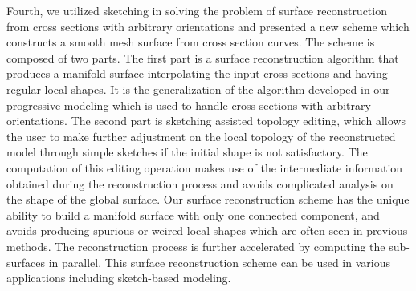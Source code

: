 Fourth, we utilized sketching  in solving the problem of surface
reconstruction from cross sections with arbitrary orientations and
presented a new scheme which constructs a smooth mesh surface from
cross section curves. The scheme is composed of two parts. The first
part is a surface reconstruction algorithm that produces a manifold
surface interpolating the input cross sections and having regular
local shapes. It is the  generalization of the algorithm developed
in our progressive modeling which is used to handle cross sections with arbitrary
orientations. The second part is sketching assisted topology
editing, which allows the user to make further adjustment on the
local topology of the reconstructed model through simple sketches if
the initial shape is not satisfactory. The computation of this
editing operation makes use of the intermediate information obtained
during the reconstruction process and avoids complicated analysis on
the shape of the global surface. Our surface reconstruction scheme
has the unique ability to build a manifold surface with only one
connected component, and avoids producing spurious or weired local
shapes which are often seen in previous methods. The reconstruction
process is further accelerated by computing the sub-surfaces in
parallel. This surface reconstruction scheme can be used in various
applications including sketch-based modeling.


